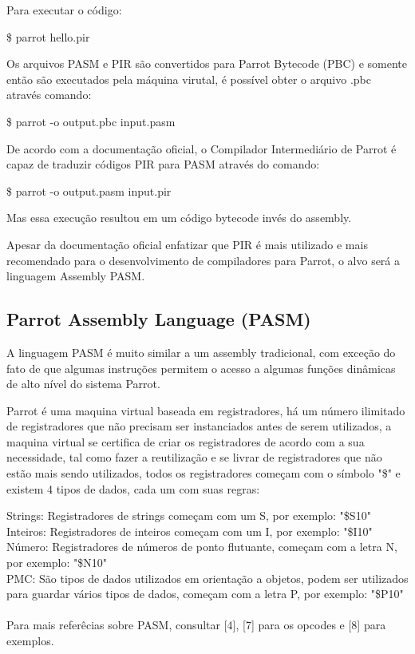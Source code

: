 \documentclass[12pt,a4paper,twoside]{report}
\begin{document}

Para executar o código:
\begin{terminal}
\$ parrot hello.pir
\end{terminal}

Os arquivos PASM e PIR são convertidos para Parrot Bytecode (PBC) e somente então são executados pela máquina virutal, é possível obter o arquivo .pbc através comando:
\begin{terminal}
\$ parrot -o output.pbc input.pasm
\end{terminal}

De acordo com a documentação oficial, o Compilador Intermediário de Parrot é capaz de traduzir códigos PIR para PASM através do comando:
\begin{terminal}
\$ parrot -o output.pasm input.pir
\end{terminal}
Mas essa execução resultou em um código bytecode invés do assembly.

Apesar da documentação oficial enfatizar que PIR é mais utilizado e mais recomendado para o desenvolvimento de compiladores para Parrot, o alvo será a linguagem Assembly PASM.

\subsection{Parrot Assembly Language (PASM)}
A linguagem PASM é muito similar a um assembly tradicional, com exceção do fato de que algumas instruções permitem o acesso a algumas funções dinâmicas de alto nível do sistema Parrot.

Parrot é uma maquina virtual baseada em registradores, há um número ilimitado de registradores que não precisam ser instanciados antes de serem utilizados, a maquina virtual se certifica de criar os registradores de acordo com a sua necessidade,
tal como fazer a reutilização e se livrar de registradores que não estão mais sendo utilizados, todos os registradores começam com o símbolo "\$" e existem 4 tipos de dados, cada um com suas regras:


Strings: Registradores de strings começam com um S, por exemplo: "\$S10" \\
Inteiros: Registradores de inteiros começam com um I, por exemplo: "\$I10" \\
Número: Registradores de números de ponto flutuante, começam com a letra N, por exemplo: "\$N10" \\
PMC: São tipos de dados utilizados em orientação a objetos, podem ser utilizados para guardar vários tipos de dados, começam com a letra P, por exemplo: "\$P10" \\
\\
Para mais referêcias sobre PASM, consultar [4], [7] para os opcodes e [8] para exemplos.
\end{document}
